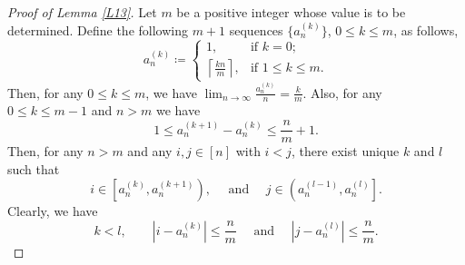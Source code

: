 \begin{proof}[Proof of Lemma \ref{L13}]
Let $m$ be a positive integer whose value is to be determined. Define the following $m+1$ sequences $\{ a^{(k)}_n \}$, $0 \le k \le m$, as follows,
\begin{equation}
a^{(k)}_n \coloneqq 
\begin{cases}
1, &\text{if $k = 0$;}\\
\left\lceil\frac{k n}{m}\right\rceil, &\text{if $1 \le k \le m$}.
\end{cases} 
\label{eq:L13a}
\end{equation}
Then, for any $0 \le k \le m$, we have $\lim_{n \to \infty}\frac{ a^{(k)}_n}{n} = \frac{k}{m}$.
Also, for any $0 \le k \le m-1$ and $n > m$ we have
\[
1 \le a^{(k+1)}_n - a^{(k)}_n \le \frac{n}{m} + 1.
\]
Then, for any $n > m$ and any $i, j \in [n]$ with $ i < j$, there exist unique $k$ and $l$ such that
\begin{equation}
 i \in \left[a^{(k)}_n, a^{(k+1)}_n \right), \quad \text{ and }\quad j \in \left(a^{(l-1)}_n, a^{(l)}_n \right]. \label{eq:L13b}
\end{equation}
Clearly, we have
\begin{equation}
 k  < l, \qquad  |i - a^{(k)}_n| \le \frac{n}{m} \quad \text{ and } \quad |j - a^{(l)}_n| \le \frac{n}{m}. \label{eq:L13c}
\end{equation}



\end{proof}
